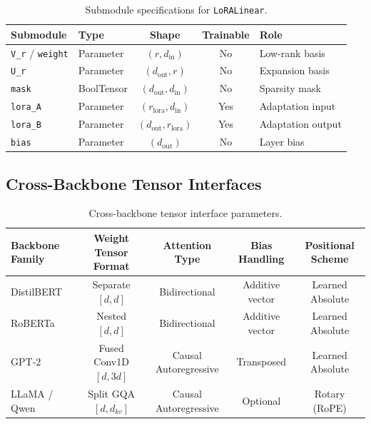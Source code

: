 {\begin{table}[H]
\centering
\small
\begin{tabular}{llccp{5cm}}
\toprule
\textbf{Submodule} & \textbf{Type} & \textbf{Shape} & \textbf{Trainable} & \textbf{Role} \\
\midrule
\texttt{V\_r} / \texttt{weight} & Parameter & $(r, d_{\text{in}})$ & No & Low-rank basis \\
\texttt{U\_r} & Parameter & $(d_{\text{out}}, r)$ & No & Expansion basis \\
\texttt{mask} & BoolTensor & $(d_{\text{out}}, d_{\text{in}})$ & No & Sparsity mask \\
\texttt{lora\_A} & Parameter & $(r_{\text{lora}}, d_{\text{in}})$ & Yes & Adaptation input \\
\texttt{lora\_B} & Parameter & $(d_{\text{out}}, r_{\text{lora}})$ & Yes & Adaptation output \\
\texttt{bias} & Parameter & $(d_{\text{out}})$ & No & Layer bias \\
\bottomrule
\end{tabular}
\caption{Submodule specifications for \texttt{LoRALinear}.}
\label{tab:submodules_fullattention}
\end{table}

\subsection{Cross-Backbone Tensor Interfaces}
\begin{table}[H]
\centering
\small
\begin{tabular}{lcccc}
\toprule
\textbf{Backbone Family} & \textbf{Weight Tensor Format} & \textbf{Attention Type} & \textbf{Bias Handling} & \textbf{Positional Scheme} \\
\midrule
DistilBERT & Separate $[d, d]$ & Bidirectional & Additive vector & Learned Absolute \\
RoBERTa & Nested $[d, d]$ & Bidirectional & Additive vector & Learned Absolute \\
GPT-2 & Fused Conv1D $[d, 3d]$ & Causal Autoregressive & Transposed & Learned Absolute \\
LLaMA / Qwen & Split GQA $[d, d_{kv}]$ & Causal Autoregressive & Optional & Rotary (RoPE) \\
\bottomrule
\end{tabular}
\caption{Cross-backbone tensor interface parameters.}
\label{tab:backbone_interfaces}
\end{table}

}
